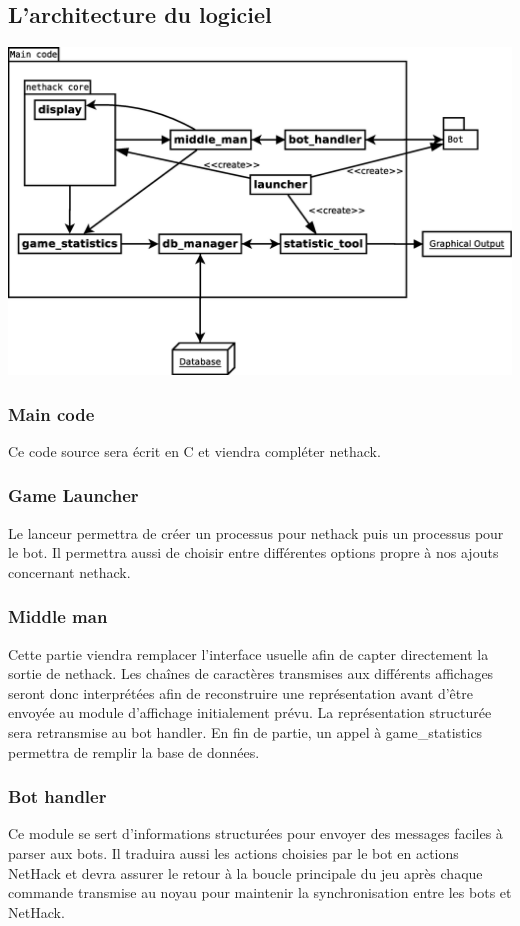 \documentclass[12pt]{article}
\begin{document}
\subsection{L'architecture du logiciel}
\begin{center}
  \includegraphics[width=180mm]{diagrammes/new_archi.eps}
\end{center}

\subsubsection*{Main code}
Ce code source sera écrit en C et viendra compléter nethack.
\subsubsection*{Game Launcher}
Le lanceur permettra de créer un processus pour nethack puis un processus pour le bot. Il permettra aussi de choisir entre différentes options propre à nos ajouts concernant nethack.
\subsubsection*{Middle man}
Cette partie viendra remplacer l'interface usuelle afin de capter directement la sortie de nethack. Les chaînes de caractères transmises aux différents affichages seront donc interprétées afin de reconstruire une représentation avant d'être envoyée au module d'affichage initialement prévu.
La représentation structurée sera retransmise au bot handler. En fin de partie, un appel à game\_statistics permettra de remplir la base de données.
\subsubsection*{Bot handler}
Ce module se sert d'informations structurées pour envoyer des messages faciles
à parser aux bots. Il traduira aussi les actions choisies par le bot en
actions NetHack et devra assurer le retour à la boucle principale du jeu après
chaque commande transmise au noyau pour maintenir la synchronisation entre les
bots et NetHack.
\end{document}
